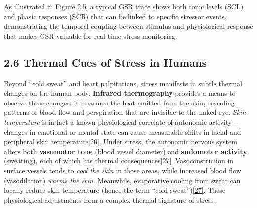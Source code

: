 \documentclass[12pt,a4paper]{article}
\begin{document}
As illustrated in Figure 2.5, a typical GSR trace shows both tonic levels (SCL) and phasic responses (SCR) that can be linked to specific stressor events, demonstrating the temporal coupling between stimulus and physiological response that makes GSR valuable for real-time stress monitoring.

\subsection{2.6 Thermal Cues of Stress in Humans}\label{thermal-cues-of-stress-in-humans}

Beyond ``cold sweat'' and heart palpitations, stress manifests in subtle thermal changes on the human body. \textbf{Infrared thermography} provides a means to observe these changes: it measures the heat emitted from the skin, revealing patterns of blood flow and perspiration that are invisible to the naked eye. \emph{Skin temperature} is in fact a known physiological correlate of autonomic activity -- changes in emotional or mental state can cause measurable shifts in facial and peripheral skin temperature\href{https://pmc.ncbi.nlm.nih.gov/articles/PMC10385045/\#:~:text=Skin\%20temperature\%20reflects\%20the\%20Autonomic,CM}{{[}26{]}}. Under stress, the autonomic nervous system alters both \textbf{vasomotor tone} (blood vessel diameter) and \textbf{sudomotor activity} (sweating), each of which has thermal consequences\href{https://pmc.ncbi.nlm.nih.gov/articles/PMC10385045/\#:~:text=responsible\%20for\%20the\%20thermal\%20modulation,6\%20\%2C\%2030\%2C10}{{[}27{]}}. Vasoconstriction in surface vessels tends to \emph{cool the skin} in those areas, while increased blood flow (vasodilation) \emph{warms the skin}. Meanwhile, evaporative cooling from sweat can locally reduce skin temperature (hence the term ``cold sweat'')\href{https://pmc.ncbi.nlm.nih.gov/articles/PMC10385045/\#:~:text=responsible\%20for\%20the\%20thermal\%20modulation,6\%20\%2C\%2030\%2C10}{{[}27{]}}. These physiological adjustments form a complex thermal signature of stress.
\end{document}
